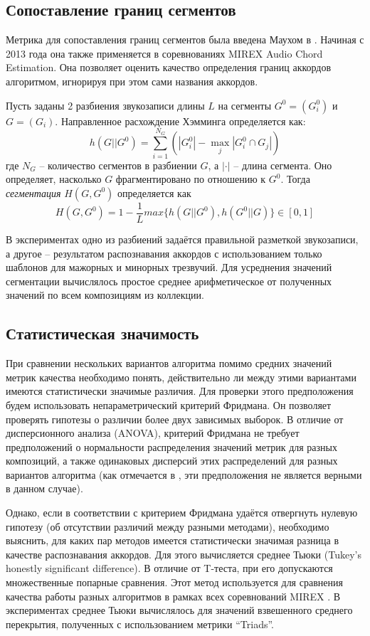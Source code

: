 \subsection{Сопоставление границ сегментов}

Метрика для сопоставления границ сегментов была введена Маухом в
\cite{MauchThesis2010}. Начиная с 2013 года она также применяется в
соревнованиях MIREX Audio Chord Estimation. Она позволяет оценить качество
определения границ аккордов алгоритмом, игнорируя при этом сами названия
аккордов.

Пусть заданы 2 разбиения звукозаписи длины $L$ на сегменты $G^0 = (G_i^0)$ и $G
= (G_i)$. Направленное расхождение Хэмминга определяется как:
$$
h(G||G^0) = \sum_{i=1}^{N_G} \left( |G_i^0| - \underset{j}{\operatorname{max}}
|G_i^0 \cap G_j| \right)
$$
где $N_G$ -- количество сегментов в разбиении $G$, а $| \cdot |$ -- длина
сегмента. Оно определяет, насколько $G$ фрагментировано по отношению к $G^0$.
Тогда \emph{сегментация} $H(G, G^0)$ определяется как
$$H(G, G^0) = 1 - \frac{1}{L} max\{ h(G||G^0), h(G^0||G) \} \in [0,1]$$

В экспериментах одно из разбиений задаётся правильной разметкой звукозаписи, а
другое -- результатом распознавания аккордов с использованием только шаблонов
для мажорных и минорных трезвучий. Для усреднения значений сегментации
вычислялось простое среднее арифметическое от полученных значений по всем
композициям из коллекции.

\subsection{Статистическая значимость}

При сравнении нескольких вариантов алгоритма помимо средних значений метрик
качества необходимо понять, действительно ли между этими вариантами имеются
статистически значимые различия. Для проверки этого предположения будем
использовать непараметрический критерий Фридмана. Он позволяет проверять
гипотезы о различии более двух зависимых выборок. В отличие от дисперсионного
анализа (ANOVA), критерий Фридмана не требует предположений о нормальности
распределения значений метрик для разных композиций, а также одинаковых
дисперсий этих распределений для разных вариантов алгоритма (как отмечается в
\cite{Mauch2010}, эти предположения не является верными в данном случае).

Однако, если в соответствии с критерием Фридмана удаётся отвергнуть нулевую
гипотезу (об отсутствии различий между разными методами), необходимо выяснить,
для каких пар методов имеется статистически значимая разница в качестве
распознавания аккордов. Для этого вычисляется среднее Тьюки (Tukey's honestly
significant difference). В отличие от T-теста, при его допускаются множественные
попарные сравнения. Этот метод используется для сравнения качества работы разных
алгоритмов в рамках всех соревнований MIREX \cite{Downie2008}. В экспериментах
среднее Тьюки вычислялось для значений взвешенного среднего перекрытия,
полученных с использованием метрики ``Triads''.


